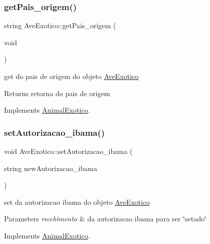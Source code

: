 \subsubsection{\texorpdfstring{getPais\_origem()}{getPais\_origem()}}
{\footnotesize\ttfamily string Ave\+Exotico\+::get\+Pais\+\_\+origem (\begin{DoxyParamCaption}\item[{void}]{ }\end{DoxyParamCaption})\hspace{0.3cm}{\ttfamily [virtual]}}



get do pais de origem do objeto \mbox{\hyperlink{class_ave_exotico}{Ave\+Exotico}} 

\begin{DoxyReturn}{Returns}
retorna do pais de origem 
\end{DoxyReturn}


Implements \mbox{\hyperlink{class_animal_exotico}{Animal\+Exotico}}.

\mbox{\label{class_ave_exotico_acdc5422c3b3ecf2bc243a90ca290d9c5}} 
\subsubsection{\texorpdfstring{setAutorizacao\_ibama()}{setAutorizacao\_ibama()}}
{\footnotesize\ttfamily void Ave\+Exotico\+::set\+Autorizacao\+\_\+ibama (\begin{DoxyParamCaption}\item[{string}]{new\+Autorizacao\+\_\+ibama }\end{DoxyParamCaption})\hspace{0.3cm}{\ttfamily [virtual]}}



set da autorizacao ibama do objeto \mbox{\hyperlink{class_ave_exotico}{Ave\+Exotico}} 


\begin{DoxyParams}{Parameters}
{\em recebimento} & da autorizacao ibama para ser \char`\"{}setado\char`\"{} \\
\hline
\end{DoxyParams}


Implements \mbox{\hyperlink{class_animal_exotico_a3931a6cc8ae2d7d8e1efd6e399a63bf7}{Animal\+Exotico}}.

